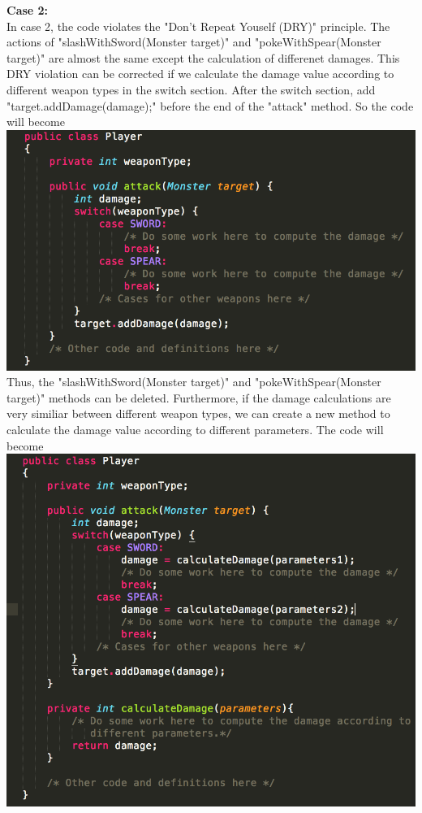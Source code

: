 \documentclass[11pt]{article}
\begin{document}
\noindent
\textbf{Case 2:}\\
In case 2, the code violates the "Don't Repeat Youself (DRY)" principle. The actions of "slashWithSword(Monster target)" and "pokeWithSpear(Monster target)" are almost the same except the calculation of differenet damages. This DRY violation can be corrected if we calculate the damage value according to different weapon types in the switch section. After the switch section, add "target.addDamage(damage);" before the end of the "attack" method. So the code will become\\

\includegraphics[scale=0.8]{case2_1}\\

Thus, the "slashWithSword(Monster target)" and "pokeWithSpear(Monster target)" methods can be deleted. Furthermore, if the damage calculations are very similiar between different weapon types, we can create a new method to calculate the damage value according to different parameters. The code will become\\

\includegraphics[scale=0.8]{case2_2}\\
\end{document}
